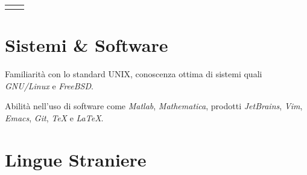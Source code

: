 \documentclass[10pt]{article} %
\begin{document}
\begin{paracol}{2}

\begin{supertabular}{rl} %
	
	

	
	
    
    

	
	
\end{supertabular}

\vspace{13pt}


\section{Sistemi \& Software}

Familiarit\`{a} con lo standard UNIX, conoscenza ottima di sistemi quali \textit{GNU/Linux} e \textit{FreeBSD}.

\medskip

Abilit\`{a} nell'uso di software come \textit{Matlab}, \textit{Mathematica}, prodotti \textit{JetBrains},
\textit{Vim}, \textit{Emacs}, \textit{Git}, \textit{\TeX} e \textit{\LaTeX}.

\vspace{20pt}


\section{Lingue Straniere}


\end{paracol}
\end{document}
